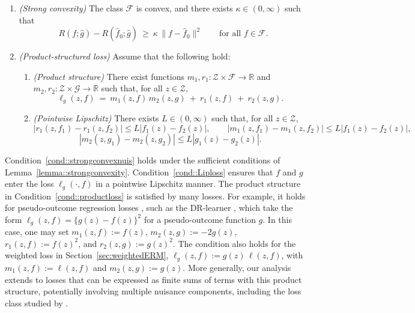\documentclass[11pt]{article}
\theoremstyle{plain}
\theoremstyle{definition} %
\begin{document}
\begin{enumerate}[label=\bfseries B\arabic*), ref={B\arabic*}, resume=nuis]
\item \textit{(Strong convexity)} \label{cond::strongconvexnuis}
The class $\mathcal{F}$ is convex, and there exists \(\kappa\in(0,\infty)\) such that
\[
R(f;\hat g)-R(\hat f_0;\hat g)\ \ge\ \kappa\,\|f-\hat f_0\|^2
\qquad\text{for all } f\in\mathcal F.
\]

\item \textit{(Product-structured loss)} \label{cond::lipcross}
Assume that the following hold:
\begin{enumerate}[label=(\roman*), ref={\ref{cond::lipcross}-\roman*}]
\item \textit{(Product structure)} \label{cond::productloss}
There exist functions \(m_1,r_1:\mathcal Z\times\mathcal F\to\mathbb R\) and
\(m_2,r_2:\mathcal Z\times\mathcal G\to\mathbb R\) such that, for all
\(z\in\mathcal Z\),
\[
\ell_g(z,f) \ =\ m_1(z,f)\,m_2(z,g) \ +\ r_1(z,f) \ +\ r_2(z,g).
\]

\item \textit{(Pointwise Lipschitz)} \label{cond::Liploss}
There exists \(L\in(0,\infty)\) such that, for all \(z\in\mathcal Z\),
\[
|r_1(z,f_1)-r_1(z,f_2)| \le L |f_1(z)-f_2(z)|,\qquad
|m_1(z,f_1)-m_1(z,f_2)| \le L |f_1(z)-f_2(z)|,
\]
\[
|m_2(z,g_1)-m_2(z,g_2)| \le L |g_1(z)-g_2(z)|.
\]
\end{enumerate}
\end{enumerate}
Condition~\ref{cond::strongconvexnuis} holds under the sufficient conditions of
Lemma~\ref{lemma::strongconvexity}. Condition~\ref{cond::Liploss} ensures that
\(f\) and \(g\) enter the loss \(\ell_g(\cdot,f)\) in a pointwise Lipschitz
manner. The product structure in Condition~\ref{cond::productloss} is satisfied
by many losses. For example, it holds for pseudo-outcome regression losses
\citep{rubin2006doubly, yang2023forster}, such as the DR-learner
\citep{TMLEOptTrt, superLearnOptRule, kennedy2023towards}, which take the form
\(\ell_g(z,f)=\{g(z)-f(z)\}^2\) for a pseudo-outcome function \(g\). In this case,
one may set \(m_1(z,f):=f(z)\), \(m_2(z,g):=-2g(z)\), \(r_1(z,f):=f(z)^2\), and
\(r_2(z,g):=g(z)^2\). The condition also holds for the weighted loss in
Section~\ref{sec:weightedERM}, \(\ell_g(z,f):=g(z)\,\ell(z,f)\), with
\(m_1(z,f):=\ell(z,f)\) and \(m_2(z,g):=g(z)\). More generally, our analysis extends to losses that can be expressed as finite sums of terms with this product structure, potentially involving multiple nuisance components, including the loss class studied by \cite{van2024combining}.
\end{document}
